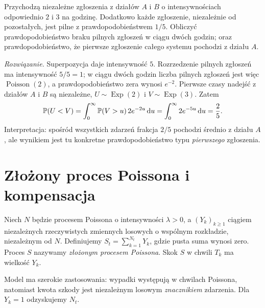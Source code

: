 \begin{zadanie}
Przychodzą niezależne zgłoszenia z działów $A$ i $B$
o intensywnościach odpowiednio $2$ i $3$ na godzinę.
Dodatkowo każde zgłoszenie, niezależnie od pozostałych, jest
pilne z prawdopodobieństwem $1/5$. Obliczyć
prawdopodobieństwo braku pilnych zgłoszeń w ciągu dwóch godzin;
oraz prawdopodobieństwo, że pierwsze zgłoszenie całego systemu
pochodzi z działu $A$.

\emph{Rozwiązanie.} Superpozycja daje intensywność $5$.
Rozrzedzenie pilnych zgłoszeń ma intensywność $5/5=1$;
w ciągu dwóch godzin liczba pilnych zgłoszeń jest więc
$\operatorname{Poisson}(2)$, a prawdopodobieństwo zera wynosi
$e^{-2}$.
Pierwsze czasy nadejść z działów $A$ i $B$ są niezależne,
$U\sim\operatorname{Exp}(2)$ i
$V\sim\operatorname{Exp}(3)$. Zatem
\[
\mathbb{P}(U<V)=\int_0^\infty \mathbb{P}(V>u)\,2e^{-2u}\,\mathrm{d} u
=\int_0^\infty 2e^{-5u}\,\mathrm{d} u=\frac25.
\]
Interpretacja: spośród wszystkich zdarzeń frakcja $2/5$
pochodzi średnio z działu $A$, ale wynikiem jest tu
konkretne prawdopodobieństwo typu \emph{pierwszego} zgłoszenia.
\end{zadanie}

\section{Złożony proces Poissona i kompensacja}
\begin{definicja}
Niech $N$ będzie procesem Poissona o intensywności $\lambda>0$,
a $(Y_k)_{k\ge1}$ ciągiem niezależnych rzeczywistych
zmiennych losowych o wspólnym rozkładzie, niezależnym od $N$.
Definiujemy $S_t=\sum_{k=1}^{N_t}Y_k$,
gdzie pusta suma wynosi zero. Proces $S$ nazywamy
\emph{złożonym procesem Poissona}. Skok $S$ w chwili $T_k$
ma wielkość $Y_k$.
\end{definicja}

Model ma szerokie zastosowania: wypadki występują w chwilach
Poissona, natomiast kwota szkody jest niezależnym losowym
\emph{znacznikiem} zdarzenia. Dla $Y_k=1$ odzyskujemy $N_t$.

